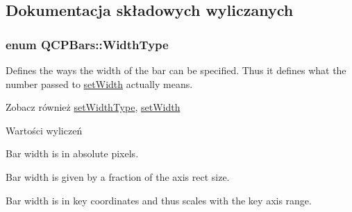 \subsection{Dokumentacja składowych wyliczanych}
\subsubsection[{\texorpdfstring{Width\+Type}{WidthType}}]{\setlength{\rightskip}{0pt plus 5cm}enum {\bf Q\+C\+P\+Bars\+::\+Width\+Type}}\hypertarget{class_q_c_p_bars_a65dbbf1ab41cbe993d71521096ed4649}{}\label{class_q_c_p_bars_a65dbbf1ab41cbe993d71521096ed4649}
Defines the ways the width of the bar can be specified. Thus it defines what the number passed to \hyperlink{class_q_c_p_bars_afec6116579d44d5b706e0fa5e5332507}{set\+Width} actually means.

\begin{DoxySeeAlso}{Zobacz również}
\hyperlink{class_q_c_p_bars_adcaa3b41281bb2c0f7949b341592fcc0}{set\+Width\+Type}, \hyperlink{class_q_c_p_bars_afec6116579d44d5b706e0fa5e5332507}{set\+Width} 
\end{DoxySeeAlso}
\begin{Desc}
\item[Wartości wyliczeń]\par
\begin{description}
\item[{\em 
wt\+Absolute\hypertarget{class_q_c_p_bars_a65dbbf1ab41cbe993d71521096ed4649ab74315c9aa77df593c58dd25dfc0de35}{}\label{class_q_c_p_bars_a65dbbf1ab41cbe993d71521096ed4649ab74315c9aa77df593c58dd25dfc0de35}
}]Bar width is in absolute pixels. \item[{\em 
wt\+Axis\+Rect\+Ratio\hypertarget{class_q_c_p_bars_a65dbbf1ab41cbe993d71521096ed4649a90bc09899361ad3422ff277f7c790ffe}{}\label{class_q_c_p_bars_a65dbbf1ab41cbe993d71521096ed4649a90bc09899361ad3422ff277f7c790ffe}
}]Bar width is given by a fraction of the axis rect size. \item[{\em 
wt\+Plot\+Coords\hypertarget{class_q_c_p_bars_a65dbbf1ab41cbe993d71521096ed4649aad3cc60ae1bfb1160a30237bee9eaf10}{}\label{class_q_c_p_bars_a65dbbf1ab41cbe993d71521096ed4649aad3cc60ae1bfb1160a30237bee9eaf10}
}]Bar width is in key coordinates and thus scales with the key axis range. \end{description}
\end{Desc}


